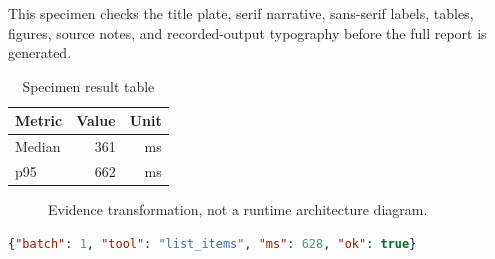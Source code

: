 

\ReportCover
{}
This specimen checks the title plate, serif narrative, sans-serif labels, tables, figures, source notes, and recorded-output typography before the full report is generated.
\begin{table}[h]\caption{Specimen result table}\EvidenceTableStart
\begin{tabularx}{\linewidth}{@{}Xrr@{}}\toprule Metric & Value & Unit\\\midrule Median & 361 & ms\\p95 & 662 & ms\\\bottomrule\end{tabularx}
\end{table}
\begin{figure}[h]\centering\caption{Evidence transformation, not a runtime architecture diagram.}\end{figure}
\begin{lstlisting}[language=json,numbers=none]
{"batch": 1, "tool": "list_items", "ms": 628, "ok": true}
\end{lstlisting}

